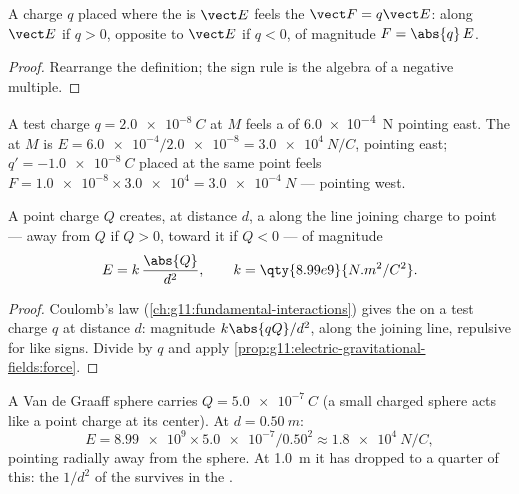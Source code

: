 \begin{proposition}\label{prop:g11:electric-gravitational-fields:force}
A charge $q$ placed where the  is $\vect E$ feels the 
$\vect F = q \vect E$: along $\vect E$ if $q > 0$, opposite to $\vect E$
if $q < 0$, of magnitude $F = \abs{q}\,E$.
\end{proposition}

\begin{proof}
Rearrange the definition; the sign rule is the algebra of a negative multiple.
\end{proof}

\begin{example}\label{ex:g11:electric-gravitational-fields:reading}
A test charge $q = \qty{+2.0e-8}{C}$ at $M$ feels a  of
\qty{6.0e-4}{N} pointing east. The  at $M$ is
$E = \num{6.0e-4} / \num{2.0e-8} = \qty{3.0e4}{N/C}$, pointing east;
$q' = \qty{-1.0e-8}{C}$ placed at the same point feels
$F = \num{1.0e-8} \times \num{3.0e4} = \qty{3.0e-4}{N}$ --- pointing west.
\end{example}

\begin{proposition}\label{prop:g11:electric-gravitational-fields:point}
A point charge $Q$ creates, at distance $d$, a  along the line
joining charge to point --- away from $Q$ if $Q > 0$, toward it if
$Q < 0$ --- of magnitude
\[
E = k\,\frac{\abs{Q}}{d^2},
\qquad k = \qty{8.99e9}{N.m^2/C^2}.
\]
\end{proposition}

\begin{proof}
Coulomb's law (\cref{ch:g11:fundamental-interactions}) gives the 
on a test charge $q$ at distance $d$: magnitude $k \abs{qQ} / d^2$,
along the joining line, repulsive for like signs. Divide by $q$ and
apply \cref{prop:g11:electric-gravitational-fields:force}.
\end{proof}

\begin{example}\label{ex:g11:electric-gravitational-fields:sphere}
A Van de Graaff sphere carries $Q = \qty{+5.0e-7}{C}$ (a small charged
sphere acts like a point charge at its center). At $d = \qty{0.50}{m}$:
\[
E = \num{8.99e9} \times \num{5.0e-7} / 0.50^2 \approx \qty{1.8e4}{N/C},
\]
pointing radially away from the sphere. At \qty{1.0}{m} it has dropped
to a quarter of this: the $1/d^2$ of the  survives in the .
\end{example}

